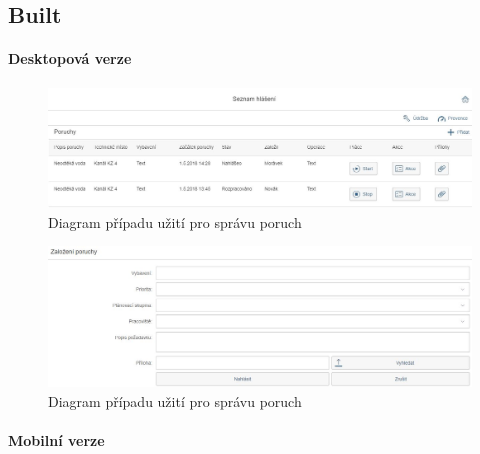 \documentclass[thesis=M,czech]{FITthesis}[2012/06/26]
\begin{document}
\subsection{Built}

\paragraph{Desktopová verze}

\begin{figure}[H]
	\centering
	\includegraphics[width=1\textwidth]{images/bu_poruchy_seznam}
	\caption{Diagram případu užití pro správu poruch}
	\label{img:uc_sprava_poruch}
\end{figure}

\begin{figure}[H]
	\centering
	\includegraphics[width=1\textwidth]{images/bu_zalozeni_poruchy}
	\caption{Diagram případu užití pro správu poruch}
	\label{img:uc_sprava_poruch}
\end{figure}

\paragraph{Mobilní verze}
\end{document}

